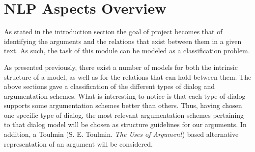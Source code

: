 \section{NLP Aspects Overview}
\par
As stated in the introduction section the goal of project becomes that of identifying the arguments and the relations that exist between them in a given text. As such, the task of this module can be modeled as a classification problem.
\par
As presented previously, there exist a number of models for both the intrinsic structure of a model, as well as for the relations that can hold between them.
The above sections gave a classification of the different types of dialog and argumentation schemes. What is interesting to notice is that each type of dialog supports some argumentation schemes better than others. Thus, having chosen one specific type of dialog, the most relevant argumentation schemes pertaining to that dialog model will be chosen as structure guidelines for our arguments. 
In addition, a Toulmin (S. E. Toulmin. \textit{The Uses of Argument}) based alternative representation of an argument will be considered.

